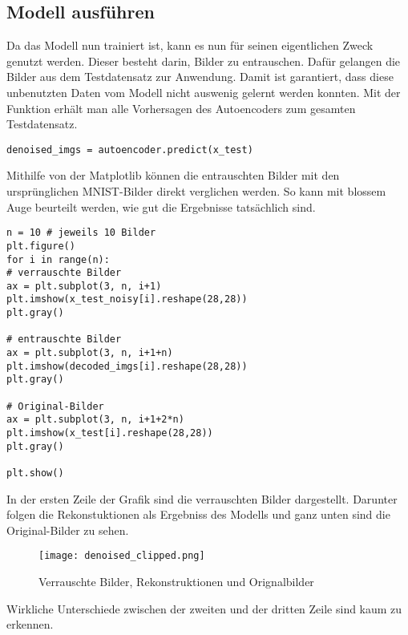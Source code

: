 \subsection{Modell ausführen}
Da das Modell nun trainiert ist, kann es nun für seinen eigentlichen Zweck
genutzt werden.
Dieser besteht darin, Bilder zu entrauschen. Dafür gelangen die
Bilder aus dem Testdatensatz zur Anwendung. Damit ist garantiert, dass diese
unbenutzten Daten vom Modell nicht auswenig gelernt werden konnten.
Mit der Funktion 
erhält man alle Vorhersagen des Autoencoders zum gesamten Testdatensatz.
\begin{verbatim}
denoised_imgs = autoencoder.predict(x_test)
\end{verbatim}
Mithilfe von der Matplotlib können die entrauschten Bilder mit den
ursprünglichen MNIST-Bilder direkt verglichen werden.
So kann mit blossem Auge beurteilt werden, wie gut die Ergebnisse tatsächlich sind.
\begin{verbatim}
n = 10 # jeweils 10 Bilder
plt.figure()
for i in range(n):
# verrauschte Bilder
ax = plt.subplot(3, n, i+1)
plt.imshow(x_test_noisy[i].reshape(28,28))
plt.gray()

# entrauschte Bilder
ax = plt.subplot(3, n, i+1+n)
plt.imshow(decoded_imgs[i].reshape(28,28))
plt.gray()

# Original-Bilder
ax = plt.subplot(3, n, i+1+2*n)
plt.imshow(x_test[i].reshape(28,28))
plt.gray()

plt.show()
\end{verbatim}
In der ersten Zeile der Grafik sind die verrauschten Bilder dargestellt.
Darunter folgen die Rekonstuktionen als Ergebniss des Modells und ganz unten
sind die Original-Bilder zu sehen.
\begin{figure}[h!]
  \centering
  \texttt{[image: denoised\_clipped.png]}
  \caption{Verrauschte Bilder, Rekonstruktionen und Orignalbilder}
\end{figure}
Wirkliche Unterschiede zwischen der zweiten und der dritten Zeile sind kaum zu erkennen.

